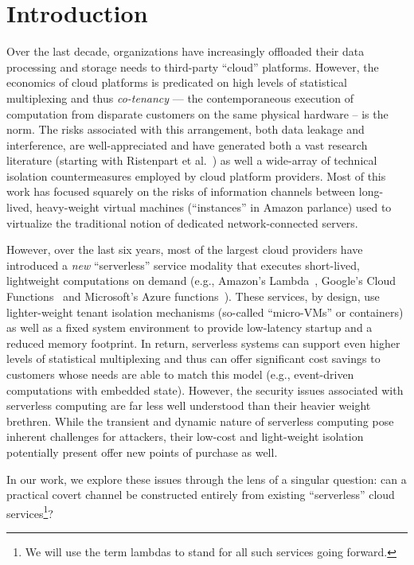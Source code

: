 \section{Introduction}
\label{sec:intro}

Over the last decade, organizations have increasingly offloaded their
data processing and storage needs to third-party ``cloud'' platforms.
However, the economics of cloud platforms is predicated on high levels
of statistical multiplexing and thus \emph{co-tenancy} --- the
contemporaneous execution of computation from disparate customers on
the same physical hardware -- is the norm.  The risks associated with
this arrangement, both data leakage and interference, are
well-appreciated and have generated both a vast research literature
(starting with Ristenpart et al.~\cite{ristenpartccs2009}) as well a
wide-array of technical isolation countermeasures employed by cloud
platform providers. Most of this work has focused squarely on the risks
of information channels between long-lived, heavy-weight virtual
machines (``instances'' in Amazon parlance) used to virtualize the
traditional notion of dedicated network-connected servers.

However, over the last six years, most of the largest cloud providers have
introduced a \emph{new} ``serverless'' service modality that executes
short-lived, lightweight computations on demand (e.g., Amazon's
Lambda~\cite{awslambda}, Google's Cloud Functions~\cite{gcpfunctions} and
Microsoft's Azure functions~\cite{azurefunctions}).  These services, by design,
use lighter-weight tenant isolation mechanisms (so-called ``micro-VMs'' or
containers) as well as a fixed system environment to provide low-latency startup
and a reduced memory footprint.  In return, serverless systems can support even
higher levels of statistical multiplexing and thus can offer significant cost
savings to customers whose needs are able to match this model (e.g.,
event-driven computations with embedded state).  However, the security issues
associated with serverless computing are far less well understood than their
heavier weight brethren. While the transient and dynamic nature of serverless
computing pose inherent challenges for attackers, their low-cost and
light-weight isolation potentially present offer new points of purchase as well.

In our work, we explore these issues through the lens of a singular question:
can a practical covert channel be constructed entirely from existing
``serverless'' cloud services\footnote{We will use the term lambdas to stand for
all such services going forward.}?


